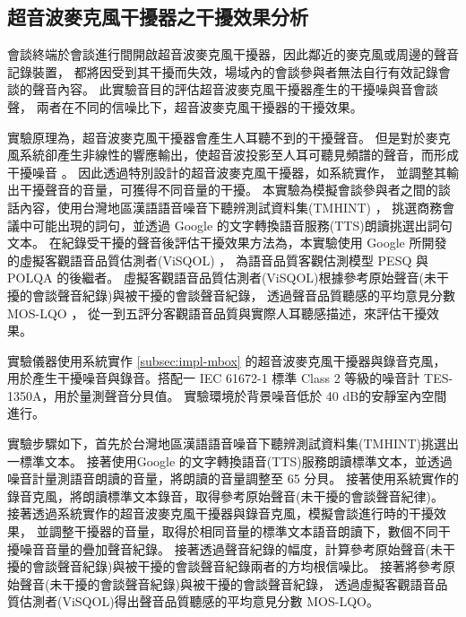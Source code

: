 \subsection{超音波麥克風干擾器之干擾效果分析}\label{subsec:exp-jammer}

    會談終端於會談進行間開啟超音波麥克風干擾器，因此鄰近的麥克風或周邊的聲音記錄裝置，
都將因受到其干擾而失效，場域內的會談參與者無法自行有效記錄會談的聲音內容。
此實驗音目的評估超音波麥克風干擾器產生的干擾噪與音會談聲，
兩者在不同的信噪比下，超音波麥克風干擾器的干擾效果。

    實驗原理為，超音波麥克風干擾器會產生人耳聽不到的干擾聲音。
但是對於麥克風系統卻產生非線性的響應輸出，使超音波投影至人耳可聽見頻譜的聲音，而形成干擾噪音
\cite{chen2019understanding}。
因此透過特別設計的超音波麥克風干擾器，如系統實作，
並調整其輸出干擾聲音的音量，可獲得不同音量的干擾。
本實驗為模擬會談參與者之間的談話內容，使用台灣地區漢語語音噪音下聽辨測試資料集(TMHINT) \cite{wong2007development}，
挑選商務會議中可能出現的詞句，並透過 Google 的文字轉換語音服務(TTS)朗讀挑選出詞句文本。
在紀錄受干擾的聲音後評估干擾效果方法為，本實驗使用 Google 所開發的虛擬客觀語音品質估測者(ViSQOL)
\cite{43990}\cite{chinen2020visqol}，
為語音品質客觀估測模型 PESQ\cite{rix2001perceptual} 與 POLQA\cite{beerends2013perceptual} 的後繼者。
虛擬客觀語音品質估測者(ViSQOL)根據參考原始聲音(未干擾的會談聲音紀錄)與被干擾的會談聲音紀錄，
透過聲音品質聽感的平均意見分數 MOS-LQO \cite{rec2006p}，
從一到五評分客觀語音品質與實際人耳聽感描述，來評估干擾效果。

    實驗儀器使用系統實作 \ref{subsec:impl-mbox} 的超音波麥克風干擾器與錄音克風，
用於產生干擾噪音與錄音。搭配一 IEC 61672-1 標準 Class 2 等級的噪音計 TES-1350A，用於量測聲音分貝值。
實驗環境於背景噪音低於 40 dB的安靜室內空間進行。

    實驗步驟如下，首先於台灣地區漢語語音噪音下聽辨測試資料集(TMHINT)挑選出一標準文本。
接著使用Google 的文字轉換語音(TTS)服務朗讀標準文本，並透過噪音計量測語音朗讀的音量，將朗讀的音量調整至 65 分貝。
接著使用系統實作的錄音克風，將朗讀標準文本錄音，取得參考原始聲音(未干擾的會談聲音紀律)。
接著透過系統實作的超音波麥克風干擾器與錄音克風，模擬會談進行時的干擾效果，
並調整干擾器的音量，取得於相同音量的標準文本語音朗讀下，數個不同干擾噪音音量的疊加聲音紀錄。
接著透過聲音紀錄的幅度，計算參考原始聲音(未干擾的會談聲音紀錄)與被干擾的會談聲音紀錄兩者的方均根信噪比。
接著將參考原始聲音(未干擾的會談聲音紀錄)與被干擾的會談聲音紀錄，
透過虛擬客觀語音品質估測者(ViSQOL)得出聲音品質聽感的平均意見分數 MOS-LQO。

